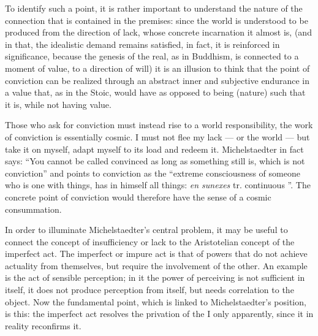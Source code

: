 To identify such a point, it is rather important to understand the nature of the connection that is contained in the premises: since the world is understood to be produced from the direction of lack, whose concrete incarnation it almost is, (and in that, the idealistic demand remains satisfied, in fact, it is reinforced in significance, because the genesis of the real, as in Buddhism, is connected to a moment of value, to a direction of will) it is an illusion to think that the point of conviction can be realized through an abstract inner and subjective endurance in a value that, as in the Stoic, would have as opposed to being (nature) such that it is, while not having value.

Those who ask for conviction must instead rise to a world responsibility, the work of conviction is essentially cosmic. I must not flee my lack --- or the world --- but take it on myself, adapt myself to its load and redeem it. Michelstaedter in fact says: ``You cannot be called convinced as long as something still is, which is not conviction'' and points to conviction as the ``extreme consciousness of someone who is one with things, has in himself all things: \emph{en sunexes} tr. continuous ''. The concrete point of conviction would therefore have the sense of a cosmic consummation.



In order to illuminate Michelstaedter's central problem, it may be useful to connect the concept of insufficiency or lack to the Aristotelian concept of the imperfect act. The imperfect or impure act is that of powers that do not achieve actuality from themselves, but require the involvement of the other. An example is the act of sensible perception; in it the power of perceiving is not sufficient in itself, it does not produce perception from itself, but needs correlation to the object. Now the fundamental point, which is linked to Michelstaedter's position, is this: the imperfect act resolves the privation of the I only apparently, since it in reality reconfirms it.

